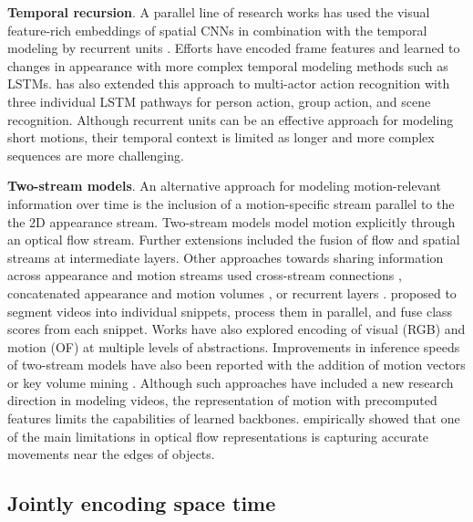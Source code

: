 \documentclass[smallextended,twocolumn,natbib]{svjour3}
\begin{document}
\noindent
\textbf{Temporal recursion}. A parallel line of research works has used the visual feature-rich embeddings of spatial CNNs in combination with the temporal modeling by recurrent units \citep{ballas2015delving,dwibedi2018temporal,yue2015beyond,ullah2017action}. Efforts \citet{donahue2015long,srivastava2015unsupervised} have encoded frame features and learned to changes in appearance with more complex temporal modeling methods such as LSTMs. \citet{wang2017recurrent} has also extended this approach to multi-actor action recognition with three individual LSTM pathways for person action, group action, and scene recognition. Although recurrent units can be an effective approach for modeling short motions, their temporal context is limited as longer and more complex sequences are more challenging. 


\noindent
\textbf{Two-stream models}. An alternative approach for modeling motion-relevant information over time is the inclusion of a motion-specific stream parallel to the the 2D appearance stream. Two-stream models \citep{simonyan2014two} model motion explicitly through an optical flow stream. Further extensions \citep{feichtenhofer2016convolutional} included the fusion of flow and spatial streams at intermediate layers. Other approaches towards sharing information across appearance and motion streams used cross-stream connections \citep{feichtenhofer2017spatiotemporal}, concatenated appearance and motion volumes \citep{jain2015modeep}, or recurrent layers \citep{singh2016multi}. \citet{wang2016temporal} proposed to segment videos into individual snippets, process them in parallel, and fuse class scores from each snippet. Works \citep{wang2017spatiotemporal} have also explored encoding of visual (RGB) and motion (OF) at multiple levels of abstractions. Improvements in inference speeds of two-stream models have also been reported with the addition of motion vectors \citep{zhang2016real} or key volume mining \citep{zhu2016key}. Although such approaches have included a new research direction in modeling videos, the representation of motion with precomputed features limits the capabilities of learned backbones. \citet{sevilla2019integration} empirically showed that one of the main limitations in optical flow representations is capturing accurate movements near the edges of objects.

\subsection{Jointly encoding space time}
\label{sec:modeling::joint}
\end{document}
